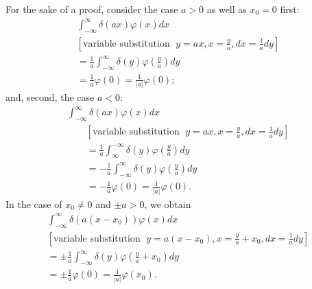 {\color{OliveGreen}
\bproof
For the sake of a proof,  consider the case $a>0$ as well as $x_0=0$ first:
 \begin{equation}
 \begin{split}
\int _{-\infty}^\infty \delta (ax)  \varphi (x)  dx
\\
  [\textrm{variable substitution }\; y = ax, x=\frac{y}{a}, dx=\frac{1}{a} dy]\\
  =
\frac{1}{a}\int _{-\infty}^\infty \delta (y)  \varphi\left (\frac{y}{a}\right) dy  \\
  =    \frac{1}{a}  \varphi (0)=    \frac{1}{\vert a\vert}  \varphi (0);
 \end{split}
 \end{equation}
and, second, the case $a<0$:
 \begin{equation}
 \begin{split}
\int _{-\infty}^\infty \delta (ax)  \varphi (x)  dx     \\
\qquad [\textrm{variable substitution }\; y = ax, x=\frac{y}{a}, dx=\frac{1}{a} dy]\\
\qquad =
\frac{1}{a}\int _\infty^{-\infty} \delta (y)  \varphi\left (\frac{y}{a}\right) dy \\
\qquad =
- \frac{1}{a}\int _{-\infty}^\infty \delta (y)  \varphi\left (\frac{y}{a}\right) dy       \\
\qquad =   - \frac{1}{a}  \varphi (0)=    \frac{1}{\vert a\vert}  \varphi (0).
 \end{split}
 \end{equation}
In the case of $x_0\neq 0$ and $\pm a>0$, we obtain
\begin{equation}
 \begin{split}
\int _{-\infty}^\infty \delta (a(x-x_0))  \varphi (x)  dx
\\
 [\textrm{variable substitution }\; y = a(x-x_0), x=\frac{y}{a}+x_0, dx=\frac{1}{a} dy]\\
 =
\pm \frac{1}{a}\int _{-\infty}^\infty \delta (y)  \varphi \left(\frac{y}{a}+x_0\right) dy  \\
 =    \pm \frac{1}{a}  \varphi (0)=\frac{1}{|a|}  \varphi (x_0).
 \end{split}
 \end{equation}
\eproof
}

